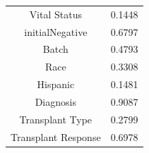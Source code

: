 \documentclass[12pt,twoside]{dukestatscithesis}
\begin{document}
\begin{longtable}[]{@{}cc@{}}
\begin{minipage}[t]{0.54\columnwidth}
Vital Status\strut
\end{minipage} & \begin{minipage}[t]{0.30\columnwidth}\centering\strut
0.1448\strut
\end{minipage}\tabularnewline
\begin{minipage}[t]{0.54\columnwidth}\centering\strut
initialNegative\strut
\end{minipage} & \begin{minipage}[t]{0.30\columnwidth}\centering\strut
0.6797\strut
\end{minipage}\tabularnewline
\begin{minipage}[t]{0.54\columnwidth}\centering\strut
Batch\strut
\end{minipage} & \begin{minipage}[t]{0.30\columnwidth}\centering\strut
0.4793\strut
\end{minipage}\tabularnewline
\begin{minipage}[t]{0.54\columnwidth}\centering\strut
Race\strut
\end{minipage} & \begin{minipage}[t]{0.30\columnwidth}\centering\strut
0.3308\strut
\end{minipage}\tabularnewline
\begin{minipage}[t]{0.54\columnwidth}\centering\strut
Hispanic\strut
\end{minipage} & \begin{minipage}[t]{0.30\columnwidth}\centering\strut
0.1481\strut
\end{minipage}\tabularnewline
\begin{minipage}[t]{0.54\columnwidth}\centering\strut
Diagnosis\strut
\end{minipage} & \begin{minipage}[t]{0.30\columnwidth}\centering\strut
0.9087\strut
\end{minipage}\tabularnewline
\begin{minipage}[t]{0.54\columnwidth}\centering\strut
Transplant Type\strut
\end{minipage} & \begin{minipage}[t]{0.30\columnwidth}\centering\strut
0.2799\strut
\end{minipage}\tabularnewline
\begin{minipage}[t]{0.54\columnwidth}\centering\strut
Transplant Response\strut
\end{minipage} & \begin{minipage}[t]{0.30\columnwidth}\centering\strut
0.6978\strut

\end{minipage}
\end{longtable}
\end{document}
